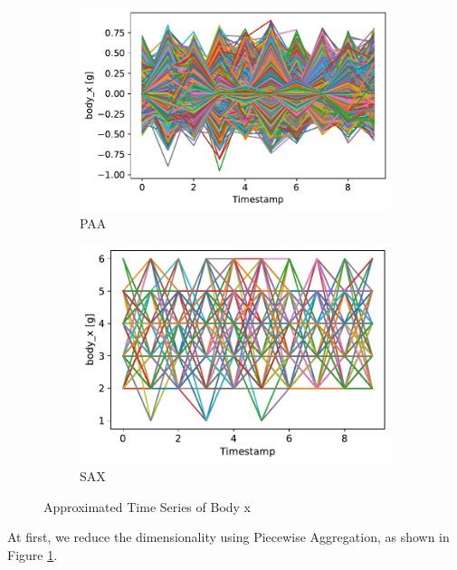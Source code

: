 \documentclass[10pt, a4paper, twocolumn]{article}
\begin{document}
\begin{figure}
    \centering

        \begin{subfigure}[t]{0.49\columnwidth}
    \includegraphics[width=\columnwidth]{X_PAA.pdf}
    \caption{PAA}
    \label{fig:paa}
    \end{subfigure}
    \begin{subfigure}[t]{0.46\columnwidth}

    \includegraphics[width=\columnwidth]{X_SAX.pdf}
    \caption{SAX}
    \label{fig:sax}
    \end{subfigure}
    \caption{Approximated Time Series of Body x}\label{approx}
\end{figure}

At first, we reduce the dimensionality using Piecewise Aggregation, as shown in Figure \ref{fig:paa}.
\end{document}
